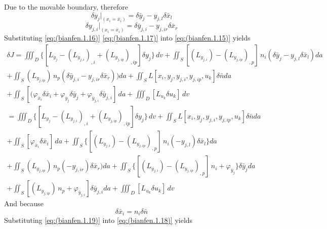 Due to the movable boundary, therefore
\begin{equation} \label{eq:(bianfen.1.16)}    
\delta y_j|_{(x_i=\bar {x}_i )}=\delta \bar{y} _j-y_{j,l}\delta \bar {x}_l
\end{equation} 
\begin{equation} \label{eq:(bianfen.1.17)}    
\delta y_{j,i}|_{(x_i=\bar {x}_i )}=\delta \bar{y} _ {j,i}-y_ {j,ir}\delta \bar {x}_r
\end{equation} 
Substituting \ref{eq:(bianfen.1.16)} \ref{eq:(bianfen.1.17)} into \ref{eq:(bianfen.1.15)} yields
\begin{multline} \label{eq:(bianfen.1.18)}    
\delta J = \iiint_D \{[L_{y_j} - \left(L_{y_{j,i}}\right)_{,i}+\left(L_{y_{j,ip}}\right)_{,ip}]\delta y_j \}\,dv +\iint_S [\left(L_{y_{j,i}}  \right) - \left(L_{y_{j,ip}}\right)_{,p}]\,n_i (\delta \bar{y} _j-y_{j,l}\delta \bar {x}_l ) da
\\+\iint_S \left(L_{y_{j,ip}}  \right)\,n_p (\delta \bar{y} _ {j,i}-y_ {j,ir}\delta \bar {x}_r )) da
+\iint_S L[x_i,y_j,y_{j,i},y_{j,ip},u_k]\delta \bar{n} da
\\+ \iint_S [(\varphi_{\bar {x}_i } \delta \bar {x}_i  + \varphi_{\bar {y}_j } \delta \bar{y} _j+\varphi_{\bar {y}_ {j,i}} \delta \bar {y}_ {j,i}] \,da
+\iiint_D [L_{u_k} \delta u_k] \,dv
\\=\iiint_D \{[L_{y_j} - \left(L_{y_{j,i}}\right)_{,i}+\left(L_{y_{j,ip}}\right)_{, ip}]\delta y_j \}\,dv 
+\iint_S L[x_i,y_j,y_{j,i},y_{j,ip},u_k]\delta \bar{n} da
\\+ \iint_S [\varphi_{\bar {x}_i } \delta \bar {x}_i  ] \,da
+\iint_S \{[\left(L_{y_{j,i}}  \right) - \left(L_{y_{j,ip}}\right)_{,p}]\,n_i (-y_{j,l})\delta \bar {x}_l \} da
\\+\iint_S \left(L_{y_{j,ip}}  \right)\,n_p (-y_{j,ir})\delta \bar {x}_r ) da
+\iint_S \{[\left(L_{y_{j,i}}  \right) -\left(L_{y_{j,ip}}\right)_{,p}]\,n_i + \varphi_{\bar {y}_j } \}\delta \bar{y} _j da
\\+\iint_S [\left(L_{y_{j,ip}}  \right)\,n_p +\varphi_{\bar {y}_ {j,i}}] \delta \bar {y}_ {j,i} da+\iiint_D [L_{u_k} \delta u_k] \,dv
\end{multline} 
And because
\begin{equation} \label{eq:(bianfen.1.19)}    
\delta \bar {x}_i = n_i \delta \bar{n}
\end{equation} 
Substituting \ref{eq:(bianfen.1.19)} into \ref{eq:(bianfen.1.18)} yields
